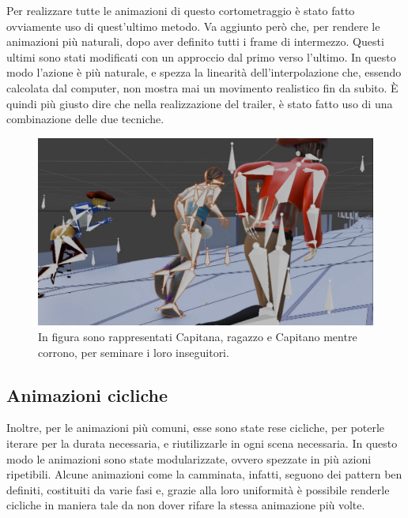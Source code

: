 Per realizzare tutte le animazioni di questo cortometraggio è stato fatto ovviamente uso di quest'ultimo metodo.
Va aggiunto però che, per rendere le animazioni più naturali, dopo aver definito tutti i frame di intermezzo.
Questi ultimi sono stati modificati con un approccio dal primo verso l'ultimo.
In questo modo l'azione è più naturale, e spezza la linearità dell'interpolazione che, essendo calcolata dal computer, non mostra mai un movimento realistico fin da subito.
È quindi più giusto dire che nella realizzazione del trailer, è stato fatto uso di una combinazione delle due tecniche.
\begin{figure}
\centering
\includegraphics[width=\textwidth]{Figures/screen3}
\decoRule
\caption[Scena esempio 5]{In figura sono rappresentati Capitana, ragazzo e Capitano mentre corrono, per seminare i loro inseguitori.}
\label{fig:eg5}
\end{figure}

\subsection{Animazioni cicliche}
Inoltre, per le animazioni più comuni, esse sono state rese cicliche, per poterle iterare per la durata necessaria, e riutilizzarle in ogni scena necessaria.
In questo modo le animazioni sono state modularizzate, ovvero spezzate in più azioni ripetibili.
Alcune animazioni come la camminata, infatti, seguono dei pattern ben definiti, costituiti da varie fasi e,
grazie alla loro uniformità è possibile renderle cicliche in maniera tale da non dover rifare la stessa animazione più volte.

